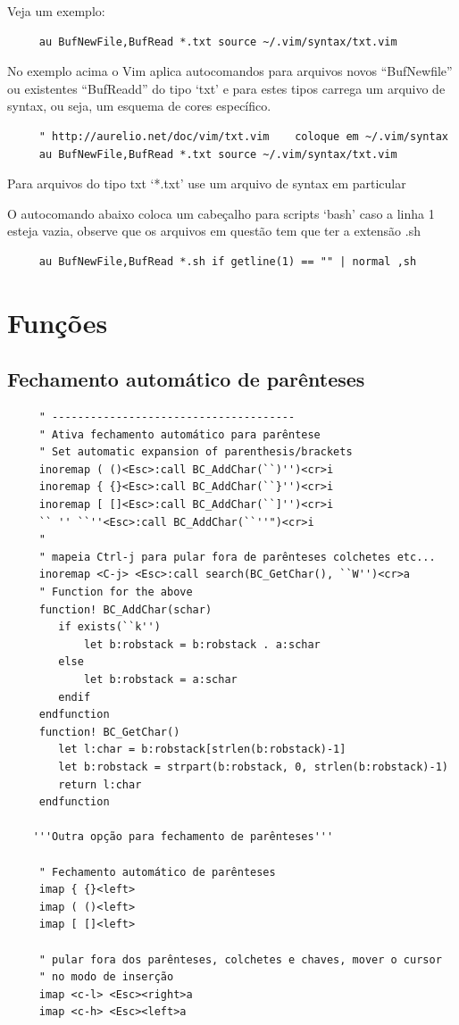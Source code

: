 \documentclass[10pt,a4paper,openany]{book}
\begin{document}
Veja um exemplo:

\begin{verbatim}
     au BufNewFile,BufRead *.txt source ~/.vim/syntax/txt.vim
\end{verbatim}

No exemplo acima o Vim aplica autocomandos para arquivos novos
``BufNewfile'' ou existentes ``BufReadd'' do tipo `txt' e para estes tipos
carrega um arquivo de syntax, ou seja, um esquema de cores específico.

\begin{verbatim}
     " http://aurelio.net/doc/vim/txt.vim    coloque em ~/.vim/syntax
     au BufNewFile,BufRead *.txt source ~/.vim/syntax/txt.vim
\end{verbatim}

Para arquivos do tipo txt `*.txt' use um arquivo de syntax em particular

O autocomando abaixo coloca um cabeçalho para scripts `bash' caso a
linha 1 esteja vazia, observe que os arquivos em questão tem que ter a
extensão .sh

\begin{verbatim}
     au BufNewFile,BufRead *.sh if getline(1) == "" | normal ,sh
\end{verbatim}


\section{Funções}
\label{sec:Funções}

\subsection{Fechamento automático de parênteses}
\label{sec:Fechamento automático de parênteses}

\begin{verbatim}
     " --------------------------------------
     " Ativa fechamento automático para parêntese
     " Set automatic expansion of parenthesis/brackets
     inoremap ( ()<Esc>:call BC_AddChar(``)'')<cr>i
     inoremap { {}<Esc>:call BC_AddChar(``}'')<cr>i
     inoremap [ []<Esc>:call BC_AddChar(``]'')<cr>i
     `` '' ``''<Esc>:call BC_AddChar(``''")<cr>i
     "
     " mapeia Ctrl-j para pular fora de parênteses colchetes etc...
     inoremap <C-j> <Esc>:call search(BC_GetChar(), ``W'')<cr>a
     " Function for the above
     function! BC_AddChar(schar)
        if exists(``k'')
            let b:robstack = b:robstack . a:schar
        else
            let b:robstack = a:schar
        endif
     endfunction
     function! BC_GetChar()
        let l:char = b:robstack[strlen(b:robstack)-1]
        let b:robstack = strpart(b:robstack, 0, strlen(b:robstack)-1)
        return l:char
     endfunction
    
    '''Outra opção para fechamento de parênteses'''
    
     " Fechamento automático de parênteses
     imap { {}<left>
     imap ( ()<left>
     imap [ []<left>
    
     " pular fora dos parênteses, colchetes e chaves, mover o cursor
     " no modo de inserção
     imap <c-l> <Esc><right>a
     imap <c-h> <Esc><left>a
\end{verbatim}
\end{document}
